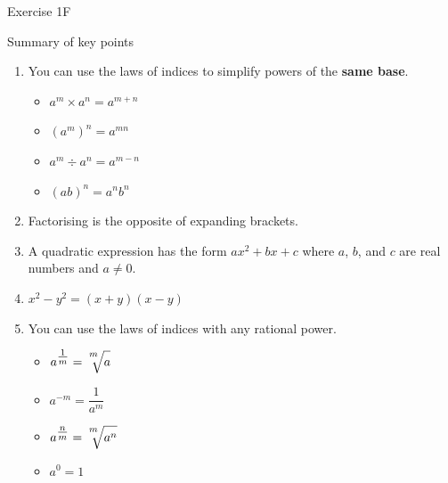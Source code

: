 \documentclass[fleqn, twoside]{article}
\begin{document}
\vfill
\begin{practice*}{Exercise 1F}{}
\end{practice*}
\newpage

\begin{mybox2}[colbacktitle=green]{Summary of key points}
    \begin{enumerate}
        \item You can use the laws of indices to simplify powers of the \textbf{same base}.
            \begin{multicols}{2}
                \begin{itemize}
                    \item $a^m\times a^n = a^{m+n}$
                    \item $(a^m)^n = a^{mn}$
                \end{itemize}
                \columnbreak
                \begin{itemize}
                    \setlength{\itemsep}{-3pt}
                    \item $a^m\div a^n = a^{m-n}$
                    \item $(ab)^n = a^nb^n$
                \end{itemize}
            \end{multicols}
        \item Factorising is the opposite of expanding brackets.
        \item A quadratic expression has the form $ax^2+bx+c$ where $a$, $b$, and $c$ are real numbers and $a\neq0$.
        \item $x^2-y^2=(x+y)(x-y)$
        \item You can use the laws of indices with any rational power.
            \begin{multicols}{2}
                \begin{itemize}
                    \item $a^{\textstyle\frac{1}{m}}=\sqrt[\textstyle{^m}]{\strut a}$
                    \item $a^{-m}=\dfrac{1}{a^m}$
                \end{itemize}
                \columnbreak
                \begin{itemize}
                    \setlength{\itemsep}{-3pt}
                    \item $a^{\textstyle\frac{n}{m}}=\sqrt[\textstyle{^m}]{\strut a^n}$
                    \item $a^0 = 1$
                \end{itemize}

\end{multicols}
\end{enumerate}
\end{mybox2}
\end{document}
